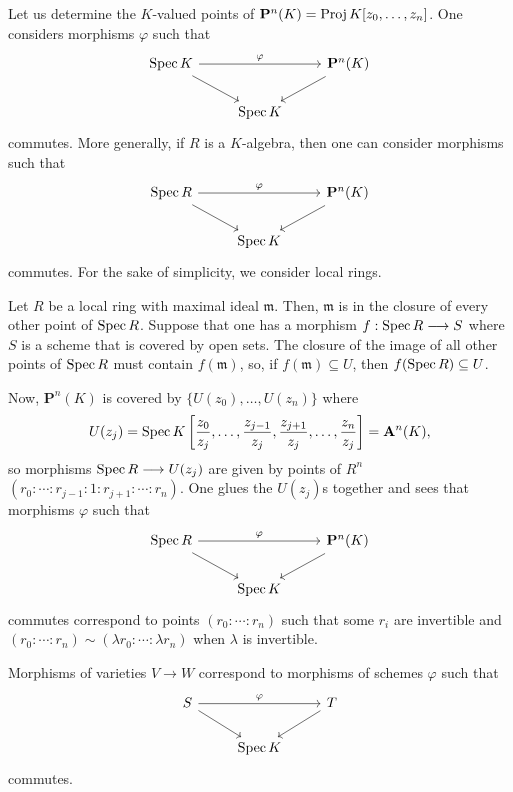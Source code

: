\documentclass [11 pt, oneside] {article}
\begin{document}
\begin{example}[ ]\label{}\text{}
Let us determine the $K$-valued points of $\mathbf{P}^n(K) = \operatorname{Proj} K[ z_0,\hdots, z_n]$. One considers morphisms $\varphi$ such that
\[
\begin{tikzcd}
	\Spec K \ar[rr,"\varphi"] \ar[dr] &&\mathbf{P}^n(K) \ar[dl] \\
					  &\Spec K
\end{tikzcd}
\]
commutes. More generally, if $R$ is a $K$-algebra, then one can consider morphisms such that
\[
\begin{tikzcd}
\Spec R\ar[rr,"\varphi"] \ar[dr] &&\mathbf{P}^n(K) \ar[dl] \\
                                          &\Spec K	
\end{tikzcd}
\]
commutes. For the sake of simplicity, we consider local rings.

Let $R$ be a local ring with maximal ideal $\mathfrak{m}$. Then, $\mathfrak{m}$ is in the closure of every other point of $\operatorname{Spec} R$. Suppose that one has a morphism $f:\operatorname{Spec} R\longrightarrow S$ where $S$ is a scheme that is covered by open sets. The closure of the image of all other points of $\operatorname{Spec} R$ must contain $f(\mathfrak{m})$, so, if $f(\mathfrak{m}) \subseteq U$, then $f(\operatorname{Spec} R)\subseteq U$.

Now, $\mathbf{P}^n(K)$ is covered by $\{U({z_0}), \hdots, U(z_n)\}$ where 
\begin{align*}
	U(z_j)= \operatorname{Spec} K \left[ \frac{z_0}{z_j},\hdots, \frac{z_{j-1}}{z_j}, \frac{z_{j+1}}{z_j},\hdots, \frac{z_n}{z_j} \right] = \mathbf{A}^n(K), 
\end{align*}
so morphisms $\operatorname{Spec} R\longrightarrow U(z_j)$ are given by points of $R^n$ $(r_0:\cdots:r_{j-1}:1:r_{j+1}:\cdots:r_n)$. One glues the $U(z_j)$s together and sees that morphisms $\varphi$ such that 
\[
\begin{tikzcd}
	\Spec R\ar[dr]\ar[rr,"\varphi"] &&\mathbf{P}^n(K)\ar[dl]\\
				       &\Spec K
\end{tikzcd}
\]
commutes correspond to points $(r_0:\cdots:r_n)$ such that some $r_i$ are invertible and $(r_0:\cdots:r_n) \sim (\lambda r_0:\cdots:\lambda r_n)$ when $\lambda$ is invertible.
\end{example}

\begin{remark}
	Morphisms of varieties $V\longrightarrow W$ correspond to morphisms of schemes $\varphi$ such that
	\[
	\begin{tikzcd}
		S\ar[rr,"\varphi"] \ar[dr] && T\ar[ld] \\
					   &\Spec K
	\end{tikzcd}
	\]
	commutes.	
\end{remark}
\end{document}

